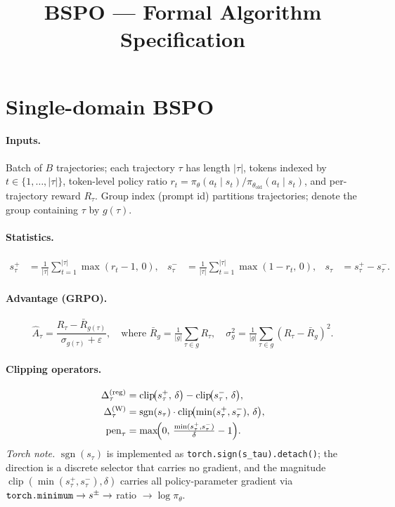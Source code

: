 \documentclass[11pt]{article}
\title{BSPO --- Formal Algorithm Specification}
\author{}
\date{}
\DeclareMathOperator*{\clip}{clip}
\DeclareMathOperator{\sign}{sgn}
\begin{document}
\maketitle

\section{Single-domain BSPO}

\paragraph{Inputs.}
Batch of $B$ trajectories; each trajectory $\tau$ has length $|\tau|$, tokens
indexed by $t\in\{1,\ldots,|\tau|\}$, token-level policy ratio
$r_t = \pi_\theta(a_t\mid s_t)/\pi_{\theta_{\text{old}}}(a_t\mid s_t)$, and
per-trajectory reward $R_\tau$. Group index (prompt id) partitions
trajectories; denote the group containing $\tau$ by $g(\tau)$.

\paragraph{Statistics.}
\begin{align*}
s_\tau^{+} &= \frac{1}{|\tau|}\sum_{t=1}^{|\tau|}\max(r_t-1,\,0),
& s_\tau^{-} &= \frac{1}{|\tau|}\sum_{t=1}^{|\tau|}\max(1-r_t,\,0),
& s_\tau &= s_\tau^{+} - s_\tau^{-}.
\end{align*}

\paragraph{Advantage (GRPO).}
\[
\hat A_\tau = \frac{R_\tau - \bar R_{g(\tau)}}{\sigma_{g(\tau)} + \varepsilon},
\quad\text{where }
\bar R_g = \tfrac{1}{|g|}\sum_{\tau\in g}R_\tau,\quad
\sigma_g^{2} = \tfrac{1}{|g|}\sum_{\tau\in g}(R_\tau - \bar R_g)^{2}.
\]

\paragraph{Clipping operators.}
\begin{align*}
\Delta_\tau^{(\mathrm{reg})}   &= \clip\!\bigl(s_\tau^{+},\,\delta\bigr) - \clip\!\bigl(s_\tau^{-},\,\delta\bigr), \\
\Delta_\tau^{(\mathrm{W})}     &= \sign(s_\tau)\cdot\clip\!\bigl(\min(s_\tau^{+},s_\tau^{-}),\,\delta\bigr), \\
\mathrm{pen}_\tau &= \max\!\Bigl(0,\,\tfrac{\min(s_\tau^{+},s_\tau^{-})}{\delta} - 1\Bigr).
\end{align*}
\emph{Torch note.} $\sign(s_\tau)$ is implemented as
\verb|torch.sign(s_tau).detach()|; the direction is a discrete selector
that carries no gradient, and the magnitude
$\clip(\min(s_\tau^+,s_\tau^-),\delta)$ carries all policy-parameter
gradient via $\verb|torch.minimum|\to s^\pm\to$ ratio $\to\log\pi_\theta$.
\end{document}
